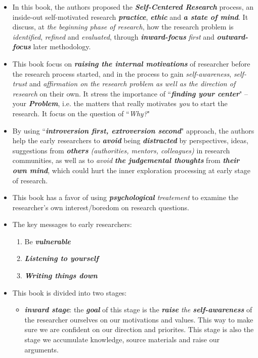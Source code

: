 \documentclass[11pt]{article}
\begin{document}
\begin{itemize}
\item In this book, the authors proposed the \emph{\textbf{Self-Centered Research}} process, an inside-out self-motivated research \emph{\textbf{practice}}, \emph{\textbf{ethic}} and \emph{\textbf{a state of mind}}. It discuss, at \emph{the beginning phase of research}, how the research problem is \emph{identified}, \emph{refined} and \emph{evaluated}, through \emph{\textbf{inward-focus}} \emph{first} and \emph{\textbf{outward-focus}} later methodology. 

\item This book focus on \emph{\textbf{raising the internal motivations}} of researcher before the research process started, and in the process to gain \emph{self-awareness}, \emph{self-trust} and \emph{affirmation on the research problem as well as the direction of research} on their own. It stress the importance of ``\emph{\textbf{finding your center}}" -- your \emph{\textbf{Problem}}, i.e. the matters that really motivates \emph{you} to start the research.  It focus on the question of ``\emph{Why?}"

\item By using ``\emph{\textbf{introversion first, extroversion second}}" approach, the authors help the early researchers to \emph{\textbf{avoid}} being \emph{\textbf{distracted}} by perspectives, ideas, suggestions from \emph{\textbf{others} (authorities, mentors, colleagues)} in research communities, as well as to \emph{avoid} \emph{\textbf{the judgemental thoughts}} from \emph{\textbf{their own mind}}, which could hurt the inner exploration processing at early stage of research. 

\item This book has a favor of using \emph{\textbf{psychological} treatement} to examine the researcher's own interest/boredom on research questions.

\item The key messages to early researchers:
\begin{enumerate}
\item Be  \emph{\textbf{vulnerable}}
\item \emph{\textbf{Listening to yourself}}
\item \emph{\textbf{Writing things down}}
\end{enumerate}

\item This book is divided into two stages:
\begin{itemize}
\item \emph{\textbf{inward stage}}: the \emph{\textbf{goal}} of this stage is the \emph{\textbf{raise} the \textbf{self-awareness}} of the researcher ourselves on our motivations and values. This way to make sure we are confident on our direction and priorites. This stage is also the stage we accumulate knowledge, source materials and raise our arguments.


\end{itemize}
\end{itemize}
\end{document}
